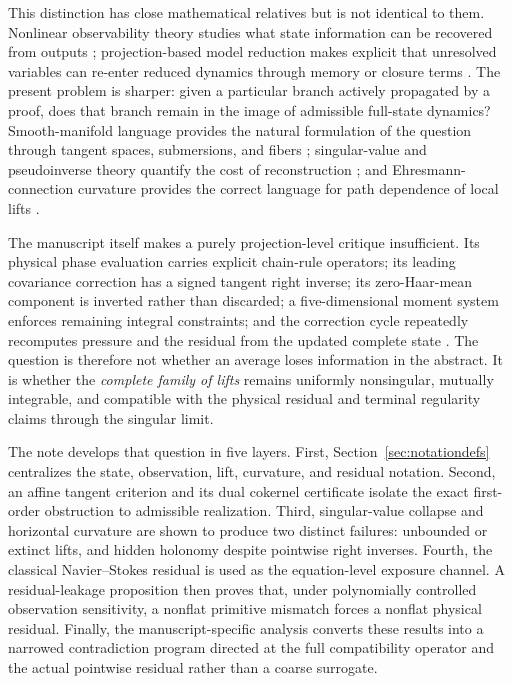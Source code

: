 \documentclass[12pt]{article}
\begin{document}
This distinction has close mathematical relatives but is not identical to them. Nonlinear observability theory studies what state information can be recovered from outputs \cite{HermannKrener}; projection-based model reduction makes explicit that unresolved variables can re-enter reduced dynamics through memory or closure terms \cite{ChorinHaldKupferman,GouasmiParishDuraisamy}. The present problem is sharper: given a particular branch actively propagated by a proof, does that branch remain in the image of admissible full-state dynamics? Smooth-manifold language provides the natural formulation of the question through tangent spaces, submersions, and fibers \cite{Lee}; singular-value and pseudoinverse theory quantify the cost of reconstruction \cite{BenIsraelGreville}; and Ehresmann-connection curvature provides the correct language for path dependence of local lifts \cite{KobayashiNomizu}.

The manuscript itself makes a purely projection-level critique insufficient. Its physical phase evaluation carries explicit chain-rule operators; its leading covariance correction has a signed tangent right inverse; its zero-Haar-mean component is inverted rather than discarded; a five-dimensional moment system enforces remaining integral constraints; and the correction cycle repeatedly recomputes pressure and the residual from the updated complete state \cite[Secs. 6--9]{OpenAI2026}. The question is therefore not whether an average loses information in the abstract. It is whether the \emph{complete family of lifts} remains uniformly nonsingular, mutually integrable, and compatible with the physical residual and terminal regularity claims through the singular limit.

The note develops that question in five layers. First, Section~\ref{sec:notationdefs} centralizes the state, observation, lift, curvature, and residual notation. Second, an affine tangent criterion and its dual cokernel certificate isolate the exact first-order obstruction to admissible realization. Third, singular-value collapse and horizontal curvature are shown to produce two distinct failures: unbounded or extinct lifts, and hidden holonomy despite pointwise right inverses. Fourth, the classical Navier--Stokes residual is used as the equation-level exposure channel. A residual-leakage proposition then proves that, under polynomially controlled observation sensitivity, a nonflat primitive mismatch forces a nonflat physical residual. Finally, the manuscript-specific analysis converts these results into a narrowed contradiction program directed at the full compatibility operator and the actual pointwise residual rather than a coarse surrogate.
\end{document}
